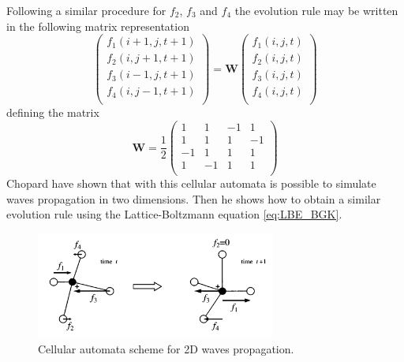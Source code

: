 Following a similar procedure for $f_2$, $f_3$ and $f_4$ the evolution rule may be written in the following matrix representation
\begin{equation}\label{eq:evolution_rule_waves}
    \begin{pmatrix}
        f_1(i+1,j,t+1) \\
        f_2(i,j+1,t+1) \\
        f_3(i-1,j,t+1) \\
        f_4(i,j-1,t+1) \\        
    \end{pmatrix}
    =
    \bm{W}\begin{pmatrix}
        f_1(i,j,t) \\
        f_2(i,j,t) \\
        f_3(i,j,t) \\
        f_4(i,j,t) \\        
    \end{pmatrix}
\end{equation}
defining the matrix 
\begin{equation}\label{eq:W_chopard_evolution_rule}
    \bm{W} = \frac{1}{2}\begin{pmatrix}
        1 & 1 & -1 & 1 \\
        1 & 1 & 1 & -1 \\
        -1 & 1 & 1 & 1 \\
        1 & -1 & 1 & 1 \\
    \end{pmatrix}
\end{equation}
Chopard have shown that with this cellular automata is possible to simulate waves propagation in two dimensions. Then he shows how to obtain a similar evolution rule using the Lattice-Boltzmann equation \ref{eq:LBE_BGK}. 
\begin{figure}
    \centering
    \includegraphics[width=0.7\textwidth]{images/LB/Chopard_2D_cellular_automata.png}
    \caption{Cellular automata scheme for 2D waves propagation.}
    \label{fig:chopard_2D_waves_cellular_automata}
\end{figure}

